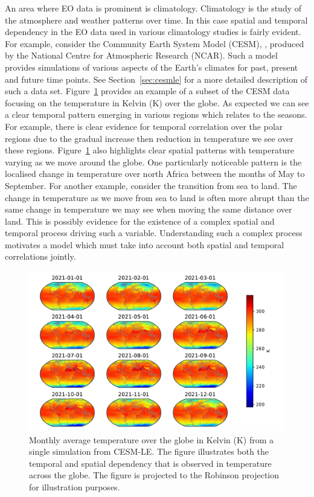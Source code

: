 An area where EO data is prominent is climatology.
Climatology is the study of the atmosphere and weather patterns over time.
In this case spatial and temporal dependency in the EO data used in various climatology studies is fairly evident.
For example, consider the Community Earth System Model (CESM), \citep{kay_community_2015}, produced by the National Centre for Atmospheric Research (NCAR).
Such a model provides simulations of various aspects of the Earth's climates for past, present and future time points.
See Section~\ref{sec:cesmle} for a more detailed description of such a data set.
Figure~\ref{fig:cesm_example} provides an example of a subset of the CESM data focusing on the temperature in Kelvin ($\si{\kelvin}$) over the globe.
As expected we can see a clear temporal pattern emerging in various regions which relates to the seasons.
For example, there is clear evidence for temporal correlation over the polar regions due to the gradual increase then reduction in temperature we see over these regions.
Figure~\ref{fig:cesm_example} also highlights clear spatial patterns with temperature varying as we move around the globe.
One particularly noticeable pattern is the localised change in temperature over north Africa between the months of May to September.
For another example, consider the transition from sea to land.
The change in temperature as we move from sea to land is often more abrupt than the same change in temperature we may see when moving the same distance over land. 
This is possibly evidence for the existence of a complex spatial and temporal process driving such a variable.
Understanding such a complex process motivates a model which must take into account both spatial and temporal correlations jointly. 



\begin{figure}[htbp!] 
	\centering    
	\includegraphics[width=1.0\textwidth]{cesm_temp_example}
	\caption[The Average monthly temperature from the CESM-LE dataset.]{Monthly average temperature over the globe in Kelvin ($\si{\kelvin}$) from a single simulation from CESM-LE. The figure illustrates both the temporal and spatial dependency that is observed in temperature across the globe. The figure is projected to the Robinson projection for illustration purposes.}
	\label{fig:cesm_example}
\end{figure}

